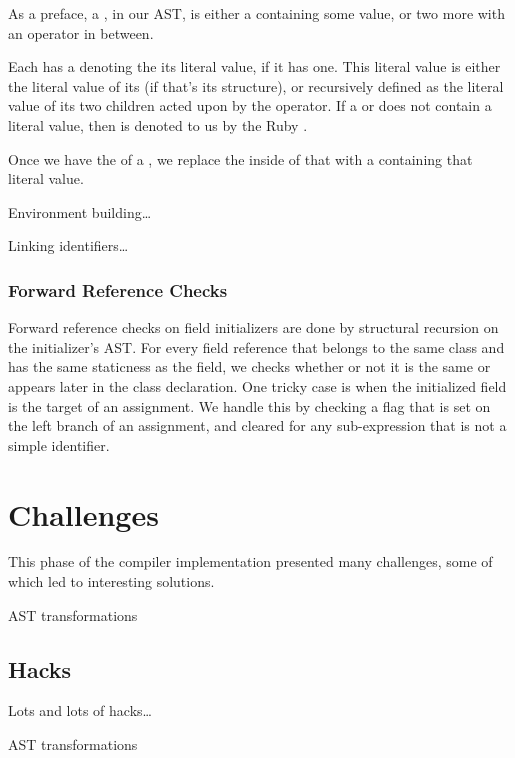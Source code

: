 \documentclass[pdftex,11pt,a4paper]{article}
\begin{document}
As a preface, a , in our AST, is either a  containing some value, or two more  with an operator in
between.

Each  has a  denoting the its literal
value, if it has one. This literal value is either the literal value of its
 (if that's its structure), or recursively defined as the literal
value of its two  children acted upon by the operator. If
a  or  does not contain a literal value, then
 is denoted to us by the Ruby .

Once we have the  of a , we replace the
inside of that  with a  containing that literal
value.

Environment building\ldots


Linking identifiers\ldots


\subsubsection{Forward Reference Checks}

Forward reference checks on field initializers are done by structural recursion
on the initializer's AST. For every field reference that belongs to the same
class and has the same staticness as the field, we checks whether or not it is
the same or appears later in the class declaration. One tricky case is when the
initialized field is the target of an assignment. We handle this by checking a
flag that is set on the left branch of an assignment, and cleared for any
sub-expression that is not a simple identifier.


\section{Challenges}

This phase of the compiler implementation presented many
challenges, some of which led to interesting solutions.

AST transformations


\subsection{Hacks}

Lots and lots of hacks\ldots

AST transformations
\end{document}

